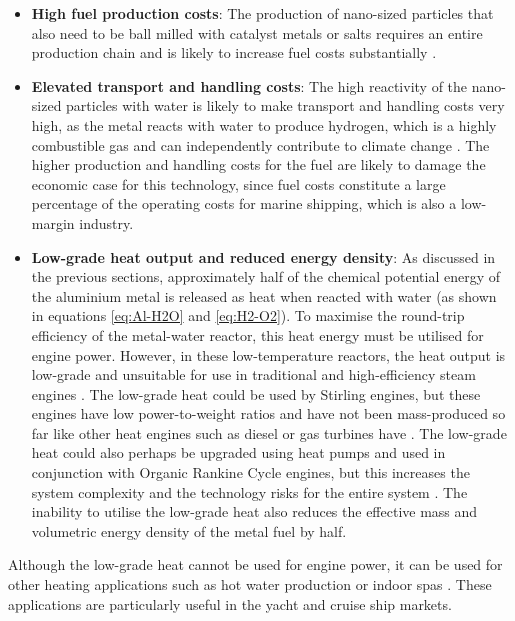 \documentclass[12pt]{article}
\begin{document}
\begin{itemize}
    \item \textbf{High fuel production costs}: The production of nano-sized particles that also need to be ball milled with catalyst metals or salts requires an entire production chain and is likely to increase fuel costs substantially \cite{high-temp-Al-H2O}.
    
    \item \textbf{Elevated transport and handling costs}: The high reactivity of the nano-sized particles with water is likely to make transport and handling costs very high, as the metal reacts with water to produce hydrogen, which is a highly combustible gas and can independently contribute to climate change \cite{hydrogen-impact-on-climate}. The higher production and handling costs for the fuel are likely to damage the economic case for this technology, since fuel costs constitute a large percentage of the operating costs for marine shipping, which is also a low-margin industry.
    
    \item \textbf{Low-grade heat output and reduced energy density}: As discussed in the previous sections, approximately half of the chemical potential energy of the aluminium metal is released as heat when reacted with water (as shown in equations \ref{eq:Al-H2O} and \ref{eq:H2-O2}). To maximise the round-trip efficiency of the metal-water reactor, this heat energy must be utilised for engine power. However, in these low-temperature reactors, the heat output is low-grade and unsuitable for use in traditional and high-efficiency steam engines \cite{metal-water-temp-JMB}. The low-grade heat could be used by Stirling engines, but these engines have low power-to-weight ratios and have not been mass-produced so far like other heat engines such as diesel or gas turbines have \cite{stirling-engine-low-grade-heat}. The low-grade heat could also perhaps be upgraded using heat pumps and used in conjunction with Organic Rankine Cycle engines, but this increases the system complexity and the technology risks for the entire system \cite{low-grade-waste-heat-recovery-heat-pump}. The inability to utilise the low-grade heat also reduces the effective mass and volumetric energy density of the metal fuel by half.
\end{itemize}

Although the low-grade heat cannot be used for engine power, it can be used for other heating applications such as hot water production or indoor spas \cite{Al-H20-CHP}. These applications are particularly useful in the yacht and cruise ship markets.
\end{document}
